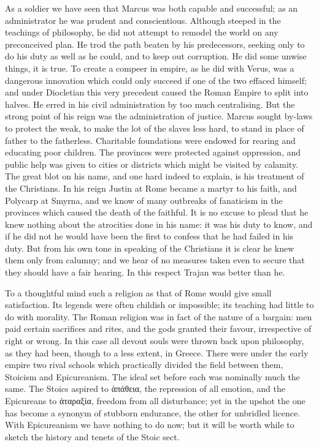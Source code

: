 As a soldier we have seen that Marcus was both capable and successful; as an
administrator he was prudent and conscientious. Although steeped in the
teachings of philosophy, he did not attempt to remodel the world on any
preconceived plan. He trod the path beaten by his predecessors, seeking only to
do his duty as well as he could, and to keep out corruption. He did some unwise
things, it is true. To create a compeer in empire, as he did with Verus, was a
dangerous innovation which could only succeed if one of the two effaced
himself; and under Diocletian this very precedent caused the Roman Empire to
split into halves. He erred in his civil administration by too much
centralising. But the strong point of his reign was the administration of
justice. Marcus sought by-laws to protect the weak, to make the lot of the
slaves less hard, to stand in place of father to the fatherless. Charitable
foundations were endowed for rearing and educating poor children. The provinces
were protected against oppression, and public help was given to cities or
districts which might be visited by calamity. The great blot on his name, and
one hard indeed to explain, is his treatment of the Christians. In his reign
Justin at Rome became a martyr to his faith, and Polycarp at Smyrna, and we
know of many outbreaks of fanaticism in the provinces which caused the death of
the faithful. It is no excuse to plead that he knew nothing about the
atrocities done in his name: it was his duty to know, and if he did not he
would have been the first to confess that he had failed in his duty. But from
his own tone in speaking of the Christians it is clear he knew them only from
calumny; and we hear of no measures taken even to secure that they should have
a fair hearing. In this respect Trajan was better than he.

To a thoughtful mind such a religion as that of Rome would give small
satisfaction. Its legends were often childish or impossible; its teaching had
little to do with morality. The Roman religion was in fact of the nature of a
bargain: men paid certain sacrifices and rites, and the gods granted their
favour, irrespective of right or wrong. In this case all devout souls were
thrown back upon philosophy, as they had been, though to a less extent, in
Greece. There were under the early empire two rival schools which practically
divided the field between them, Stoicism and Epicureanism. The ideal set before
each was nominally much the same. The Stoics aspired to
ἁπάθεια, the repression of all emotion,
and the Epicureans to ἀταραξία,
freedom from all disturbance; yet in the upshot the one has become a synonym of
stubborn endurance, the other for unbridled licence. With Epicureanism we have
nothing to do now; but it will be worth while to sketch the history and tenets
of the Stoic sect.

